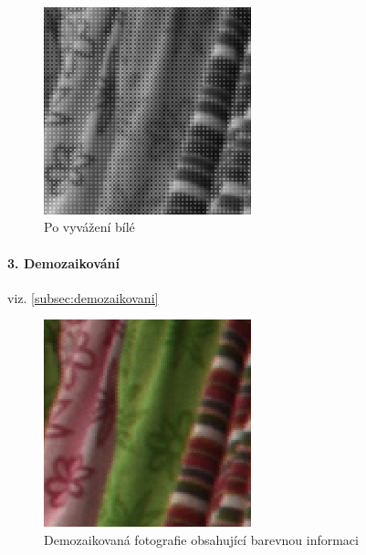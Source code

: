 \documentclass[12pt,a4paper,titlepage,final]{report}
\begin{document}
\begin{figure}[ht]
\begin{center}
\includegraphics[width=6cm]{images/e_wb.png}
\caption{Po vyvážení bílé}
\label{fig:white-balanced}
\end{center}
\end{figure}

\paragraph{3. Demozaikování} viz. \ref{subsec:demozaikovani}

\begin{figure}[ht]
\begin{center}
\includegraphics[width=6cm]{images/e_demosaiced.png}
\caption{Demozaikovaná fotografie obsahující barevnou informaci}
\label{fig:demosaiced}
\end{center}
\end{figure}
\end{document}
